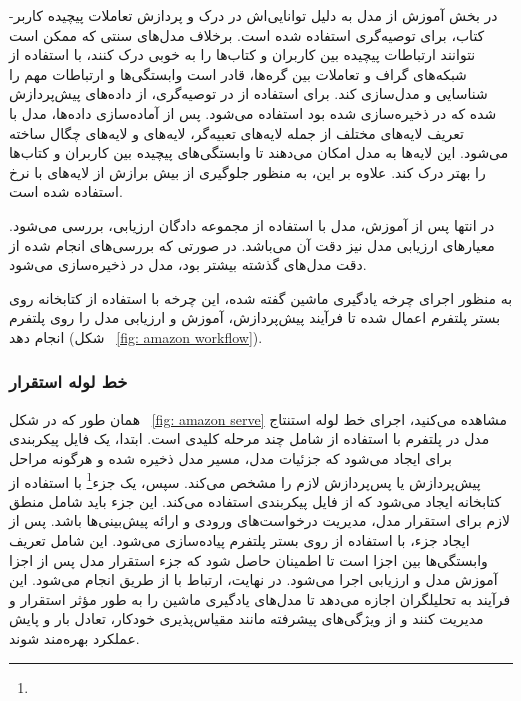 در بخش آموزش از مدل  به دلیل توانایی‌اش در درک و پردازش تعاملات پیچیده کاربر-کتاب، برای توصیه‌گری استفاده شده است. برخلاف مدل‌های سنتی که ممکن است نتوانند ارتباطات پیچیده بین کاربران و کتاب‌ها را به خوبی درک کنند،  با استفاده از شبکه‌های گراف و تعاملات بین گره‌ها، قادر است وابستگی‌ها و ارتباطات مهم را شناسایی و مدل‌سازی کند. برای استفاده از  در توصیه‌گری، از داده‌های پیش‌پردازش شده که در  ذخیره‌سازی شده بود استفاده می‌شود. پس از آماده‌سازی داده‌ها، مدل  با تعریف لایه‌های مختلف از جمله لایه‌های تعبیه‌گر، لایه‌های  و لایه‌های چگال ساخته می‌شود. این لایه‌ها به مدل امکان می‌دهند تا وابستگی‌های پیچیده بین کاربران و کتاب‌ها را بهتر درک کند. علاوه بر این،‌ به منظور جلوگیری از بیش برازش از لایه‌های  با نرخ  استفاده شده است.

در انتها پس از آموزش، مدل با استفاده از مجموعه دادگان ارزیابی، بررسی می‌شود. معیارهای ارزیابی مدل نیز دقت آن می‌باشد. در صورتی که بررسی‌های انجام شده از دقت مدل‌های گذشته بیشتر بود، مدل در  ذخیره‌سازی می‌شود.

به منظور اجرای چرخه یادگیری ماشین گفته شده، این چرخه با استفاده از کتابخانه  روی بستر پلتفرم اعمال شده تا فرآیند پیش‌پردازش،‌ آموزش و ارزیابی مدل را روی پلتفرم انجام دهد (شکل ~\ref{fig: amazon workflow}).


\subsubsection{خط لوله استقرار}
همان طور که در شکل ~\ref{fig: amazon serve} مشاهده می‌کنید، اجرای خط لوله استنتاج مدل در پلتفرم با استفاده از  شامل چند مرحله کلیدی است. ابتدا، یک فایل پیکربندی برای  ایجاد می‌شود که جزئیات مدل، مسیر مدل ذخیره شده و هرگونه مراحل پیش‌پردازش یا پس‌پردازش لازم را مشخص می‌کند. سپس، یک جزء\footnote{}  با استفاده از کتابخانه  ایجاد می‌شود که از فایل پیکربندی  استفاده می‌کند. این جزء باید شامل منطق لازم برای استقرار مدل، مدیریت درخواست‌های ورودی و ارائه پیش‌بینی‌ها باشد. پس از ایجاد جزء، با استفاده از  روی بستر پلتفرم پیاده‌سازی می‌شود. این شامل تعریف وابستگی‌ها بین اجزا است تا اطمینان حاصل شود که جزء استقرار مدل پس از اجزا آموزش مدل و ارزیابی اجرا می‌شود. در نهایت، ارتباط با  از طریق  انجام می‌شود. این فرآیند به تحلیلگران اجازه می‌دهد تا مدل‌های یادگیری ماشین را به طور مؤثر استقرار و مدیریت کنند و از ویژگی‌های پیشرفته مانند مقیاس‌پذیری خودکار، تعادل بار و پایش عملکرد بهره‌مند شوند.






